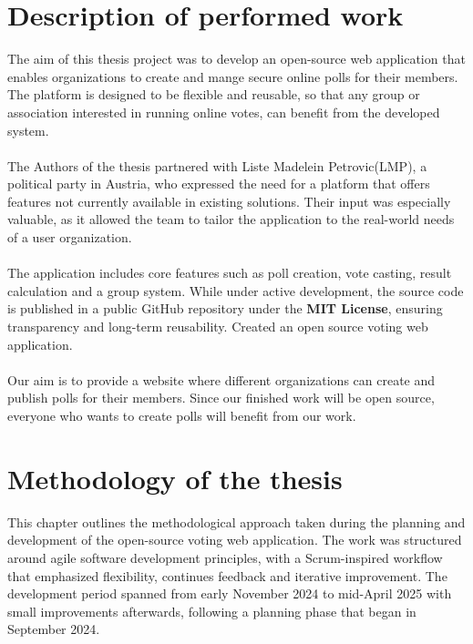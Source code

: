 \documentclass[a4paper,12pt]{report}
\begin{document}
\section{Description of performed work}
The aim of this thesis project was to develop an open-source web application that enables organizations to create and mange secure online polls for their members. The platform is designed to be flexible and reusable, so that any group or association interested in running online votes, can benefit from the developed system.\\\\
The Authors of the thesis partnered with Liste Madelein Petrovic(LMP), a political party in Austria, who expressed the need for a platform that offers features not currently available in existing solutions. Their input was especially valuable, as it allowed the team to tailor the application to the real-world needs of a user organization.\\\\
The application includes core features such as poll creation, vote casting, result calculation and a group system. While under active development, the source code is published in a public GitHub repository under the \textbf{MIT License}, ensuring transparency and long-term reusability.\parencite{opensourceinit}
Created an open source voting web application.\\\\
Our aim is to provide a website where different organizations can create and publish polls for their members. Since our finished work will be open source, everyone who wants to create polls will benefit from our work. \\ 

\section{Methodology of the thesis}
This chapter outlines the methodological approach taken during the planning and development of the open-source voting web application. The work was structured around agile software development principles, with a Scrum-inspired workflow that emphasized flexibility, continues feedback and iterative improvement. The development period spanned from early November 2024 to mid-April 2025 with small improvements afterwards, following a planning phase that began in September 2024.\\\\
\end{document}
